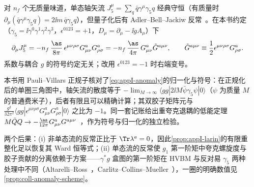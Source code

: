 \begin{remark}[轴矢反常]\label{rem:appI-anomaly}
对 $n_f$ 个无质量味道，单态轴矢流 $J_5^\mu=\sum_q\bar q\gamma^\mu\gamma_5q$ 经典守恒（有质量时 $\partial_\mu(\bar q\gamma^\mu\gamma_5q)=2\ii m\,\bar q\gamma_5q$），但量子化后有 Adler--Bell--Jackiw 反常~\cite{Adler:1969gk,Bell:1969ts}。在本书约定（$\gamma_5=\ii\gamma^0\gamma^1\gamma^2\gamma^3$，$\epsilon^{0123}=+1$，$D_\mu=\partial_\mu-\ii gA_\mu$）下
\begin{equation}\label{eq:appI-anomaly}
\partial_\mu J_5^\mu=-n_f\,\frac{\as}{8\pi}\,\epsilon^{\mu\nu\rho\sigma}G^a_{\mu\nu}G^a_{\rho\sigma}=-n_f\,\frac{\as}{4\pi}\,G^a_{\mu\nu}\tilde G^{a\mu\nu},\qquad \tilde G^{a\mu\nu}\equiv\frac12\epsilon^{\mu\nu\rho\sigma}G^a_{\rho\sigma}.
\end{equation}
系数与耦合 $g$ 的符号约定无关；改用 $\epsilon^{0123}=-1$ 时右端变号。

本书用 Pauli--Villars 正规子核对了\cref{eq:appI-anomaly}的归一化与符号：在正规化后的单圈三角图中，轴矢流的散度等于 $-\lim_{M\to\infty}\langle gg|2\ii M\bar\psi\gamma_5\psi|0\rangle$（$\psi$ 为质量 $M$ 的普通费米子），后者有限且可以精确计算；其双胶子矩阵元与 $\frac{g^2}{32\pi^2}\langle gg|\epsilon^{\mu\nu\rho\sigma}G^a_{\mu\nu}G^a_{\rho\sigma}|0\rangle$ 之比为 $-1$。同一套记账给出重夸克退耦的低能定理 $M\bar QQ\to-\frac{\as}{12\pi}G^a_{\mu\nu}G^{a\mu\nu}$~\cite{Shifman:1978zn}，作为符号与归一化的独立检验。

两个后果：(i) 非单态流的反常正比于 $\Tr\lambda^a=0$，因此\cref{prop:appI-larin}的有限重整化足以恢复其 Ward 恒等式；(ii) 单态流的反常使 $g_1$ 第一阶矩中夸克螺旋度与胶子贡献的分离依赖于方案——$\gamma^*g$ 盒图的第一阶矩在 HVBM 与反对易 $\gamma_5$ 两种处理中不同（Altarelli--Ross~\cite{AltarelliRoss1988}，Carlitz--Collins--Mueller~\cite{CarlitzCollinsMueller1988}），一圈的明确数值见\cref{prop:coll-anomaly-scheme}。
\end{remark}
